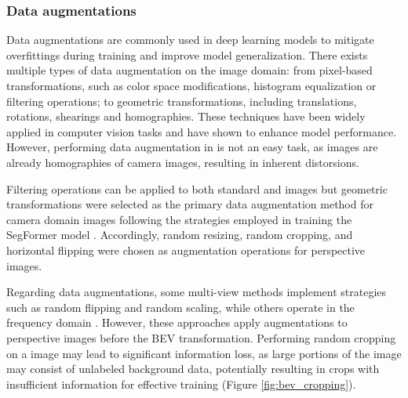 \subsubsection{Data augmentations}
\label{data_augmentations}
Data augmentations are commonly used in deep learning models to mitigate overfittings during training and improve model generalization. There exists multiple types of data augmentation on the image domain: from pixel-based transformations, such as color space modifications, histogram equalization or filtering operations; to geometric transformations, including translations, rotations, shearings and homographies. These techniques have been widely applied in computer vision tasks and have shown to enhance model performance. However, performing data augmentation in  is not an easy task, as  images are already homographies of camera images, resulting in inherent distorsions.

Filtering operations can be applied to both standard and  images but geometric transformations were selected as the primary data augmentation method for camera domain images following the strategies employed in training the SegFormer model \cite{segformer}. Accordingly, random resizing, random cropping, and horizontal flipping were chosen as augmentation operations for perspective images.

Regarding  data augmentations, some multi-view methods implement strategies such as random flipping and random scaling, while others operate in the frequency domain \cite{HSDA}. However, these approaches apply augmentations to perspective images before the BEV transformation. Performing random cropping on a  image may lead to significant information loss, as large portions of the image may consist of unlabeled background data, potentially resulting in crops with insufficient information for effective training (Figure \ref{fig:bev_cropping}). 

